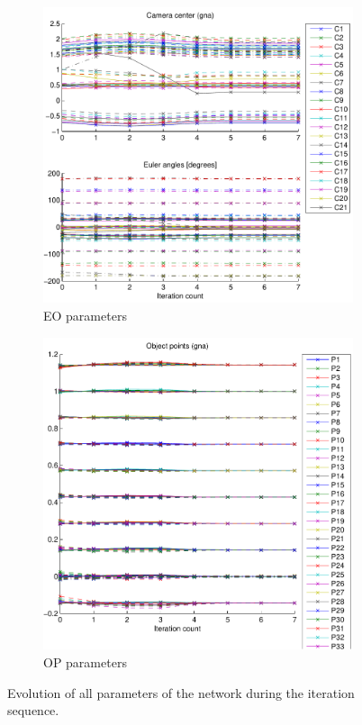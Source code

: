 \documentclass{article}
\begin{document}
\begin{figure}
\begin{subfigure}[b]{0.3\textwidth}
    \includegraphics[width=\textwidth]{ill/ccameotrace}
    \caption{EO parameters}
    \label{fig:EOtrace}
  \end{subfigure}
  \begin{subfigure}[b]{0.3\textwidth}
    \includegraphics[width=\textwidth]{ill/ccamoptrace}
    \caption{OP parameters}
    \label{fig:OPtrace}
  \end{subfigure}
  \caption{Evolution of all parameters of the network during the
    iteration sequence.}\label{fig:netTrace}
\end{figure}
\end{document}
